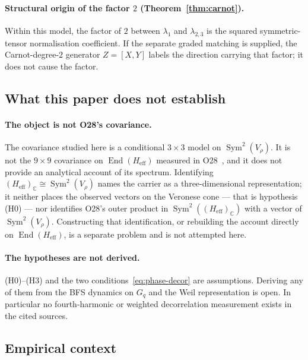 \documentclass[11pt,a4paper]{article}
\DeclareMathOperator{\Sym}{Sym}
\DeclareMathOperator{\End}{End}
\newcommand{\Heff}{H_{\mathrm{eff}}}
\begin{document}
    \paragraph{Structural origin of the factor $2$ (Theorem~\ref{thm:carnot}).}
      Within this model, the factor of $2$ between $\lambda_1$ and $\lambda_{2,3}$ is the squared
      symmetric-tensor normalisation coefficient.
      If the separate graded matching is supplied,
      the Carnot-degree-$2$ generator $Z = [X, Y]$ labels the direction carrying that factor; it
      does not cause the factor.

  \subsection{What this paper does not establish}
  \label{sec:open}

    \paragraph{The object is not O28's covariance.}
      The covariance studied here is a conditional $3\times3$ model on $\Sym^2(V_\rho)$.
      It is not the $9\times9$ covariance on $\End(\Heff)$ measured in O28~\cite{Beau2026a32}, and
      it does not provide an analytical account of its spectrum.
      Identifying $(\Heff)_{\mathbb{C}} \cong \Sym^2(V_\rho)$ names the carrier as a
      three-dimensional representation; it neither places the observed vectors on the Veronese cone
      --- that is hypothesis (H0) --- nor identifies O28's outer product in
      $\Sym^2((\Heff)_{\mathbb{C}})$ with a vector of $\Sym^2(V_\rho)$.
      Constructing that identification, or rebuilding the account directly on $\End(\Heff)$, is a
      separate problem and is not attempted here.

    \paragraph{The hypotheses are not derived.}
      (H0)--(H3) and the two conditions~\eqref{eq:phase-decor} are assumptions.
      Deriving any of them from the BFS dynamics on $G_q$ and the Weil representation is open.
      In particular no fourth-harmonic or weighted decorrelation measurement exists in the cited
      sources.

  \subsection{Empirical context}
  \label{sec:empirical}
\end{document}
